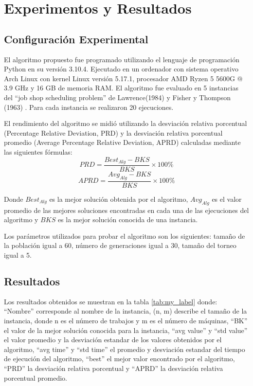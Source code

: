 \documentclass[12pt,a4paper]{article}
\begin{document}
\section{Experimentos y Resultados}
\subsection{Configuración Experimental}
    El algoritmo propuesto fue programado utilizando el lenguaje de programación Python en su versión 3.10.4. Ejecutado en un ordenador con sistema operativo Arch Linux con kernel Linux versión 5.17.1, procesador AMD Ryzen 5 5600G @ 3.9 GHz y 16 GB de memoria RAM. El algoritmo fue evaluado en 5 instancias del ``job shop scheduling problem'' de Lawrence(1984) \cite{bksla40} y Fisher y Thompson (1963) \cite{bksft06}. Para cada instancia se realizaron 20 ejecuciones.
    
    El rendimiento del algoritmo se midió utilizando la desviación relativa porcentual (Percentage Relative Deviation, PRD) y la desviación relativa porcentual promedio (Average Percentage Relative Deviation, APRD) calculadas mediante las siguientes fórmulas:
    \begin{equation}
        PRD = {\frac{Best_{Alg} - BKS}{BKS}} \times 100\%
    \end{equation}
    \begin{equation}
        APRD = {\frac{Avg_{Alg} - BKS}{BKS}} \times 100\%
    \end{equation}
    
    Donde ${Best_{Alg}}$ es la mejor solución obtenida por el algoritmo, ${Avg_{Alg}}$ es el valor promedio de las mejores soluciones encontradas en cada una de las ejecuciones del algoritmo y $BKS$ es la mejor solución conocida de una instancia.
    
    Los parámetros utilizados para probar el algoritmo son los siguientes: tamaño de la población igual a 60, número de generaciones igual a 30, tamaño del torneo igual a 5.
    
\subsection{Resultados}
    Los resultados obtenidos se muestran en la tabla \ref{tab:my_label} donde: ``Nombre'' corresponde al nombre de la instancia, (n, m) describe el tamaño de la instancia, donde n es el número de trabajos y m es el número de máquinas, ``BK'' el valor de la mejor solución conocida para la instancia, ``avg value'' y ``std value'' el valor promedio y la desviación estandar de los valores obtenidos por el algoritmo, ``avg time'' y ``std time'' el promedio y desviación estandar del tiempo de ejecución del algoritmo, ``best'' el mejor valor encontrado por el algoritmo, ``PRD'' la desviación relativa porcentual y ``APRD'' la desviación relativa porcentual promedio.
\end{document}

